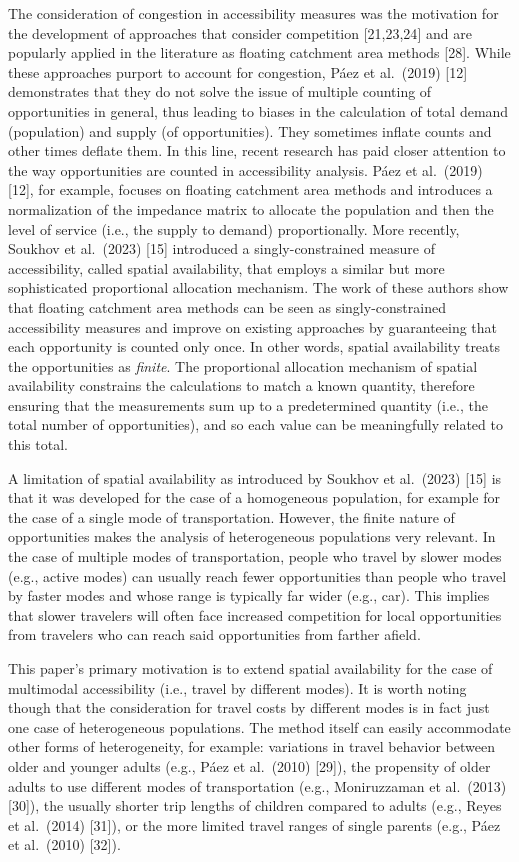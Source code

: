 \documentclass[10pt,letterpaper]{article}
\begin{document}
The consideration of congestion in accessibility measures was the
motivation for the development of approaches that consider competition
{[}21,23,24{]} and are popularly applied in the literature as floating
catchment area methods {[}28{]}. While these approaches purport to
account for congestion, Páez et al.~(2019) {[}12{]} demonstrates that
they do not solve the issue of multiple counting of opportunities in
general, thus leading to biases in the calculation of total demand
(population) and supply (of opportunities). They sometimes inflate
counts and other times deflate them. In this line, recent research has
paid closer attention to the way opportunities are counted in
accessibility analysis. Páez et al.~(2019) {[}12{]}, for example,
focuses on floating catchment area methods and introduces a
normalization of the impedance matrix to allocate the population and
then the level of service (i.e., the supply to demand) proportionally.
More recently, Soukhov et al.~(2023) {[}15{]} introduced a
singly-constrained measure of accessibility, called spatial
availability, that employs a similar but more sophisticated proportional
allocation mechanism. The work of these authors show that floating
catchment area methods can be seen as singly-constrained accessibility
measures and improve on existing approaches by guaranteeing that each
opportunity is counted only once. In other words, spatial availability
treats the opportunities as \emph{finite}. The proportional allocation
mechanism of spatial availability constrains the calculations to match a
known quantity, therefore ensuring that the measurements sum up to a
predetermined quantity (i.e., the total number of opportunities), and so
each value can be meaningfully related to this total.

A limitation of spatial availability as introduced by Soukhov et
al.~(2023) {[}15{]} is that it was developed for the case of a
homogeneous population, for example for the case of a single mode of
transportation. However, the finite nature of opportunities makes the
analysis of heterogeneous populations very relevant. In the case of
multiple modes of transportation, people who travel by slower modes
(e.g., active modes) can usually reach fewer opportunities than people
who travel by faster modes and whose range is typically far wider (e.g.,
car). This implies that slower travelers will often face increased
competition for local opportunities from travelers who can reach said
opportunities from farther afield.

This paper's primary motivation is to extend spatial availability for
the case of multimodal accessibility (i.e., travel by different modes).
It is worth noting though that the consideration for travel costs by
different modes is in fact just one case of heterogeneous populations.
The method itself can easily accommodate other forms of heterogeneity,
for example: variations in travel behavior between older and younger
adults (e.g., Páez et al.~(2010) {[}29{]}), the propensity of older
adults to use different modes of transportation (e.g., Moniruzzaman et
al.~(2013) {[}30{]}), the usually shorter trip lengths of children
compared to adults (e.g., Reyes et al.~(2014) {[}31{]}), or the more
limited travel ranges of single parents (e.g., Páez et al.~(2010)
{[}32{]}).
\end{document}
